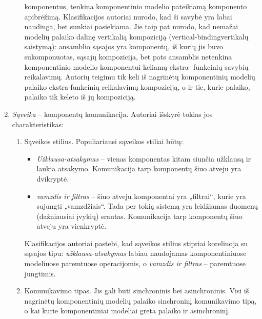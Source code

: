 \begin{enumerate}
\begin{enumerate}
        komponentus, tenkina komponentinio modelio pateikiamą
        komponento apibrėžimą. Klasifikacijos autoriai nurodo, kad
        ši savybė yra labai naudinga, bet sunkiai pasiekiama. Jie taip
        pat nurodo, kad nemažai modelių palaiko dalinę vertikalią
        kompoziciją (\gls{vertical-binding}{vertikalų saistymą}):
        ansamblio sąsajos yra komponentų, iš kurių jis buvo
        sukomponuotas, sąsajų kompozicija, bet pats ansamblis
        netenkina komponentinio modelio komponentui keliamų ekstra-
        funkcinių savybių reikalavimų. Autorių teigimu tik keli iš
        nagrinėtų komponentinių modelių palaiko ekstra-funkcinių
        reikalavimų kompoziciją, o ir tie, kurie palaiko, palaiko tik
        keleto iš jų kompoziciją.
    \end{enumerate}
  \item \emph{Sąveika}  – komponentų komunikacija.
    Autoriai išskyrė tokias jos charakteristikas:
    \begin{enumerate}
      \item Sąveikos stilius. Populiariausi sąveikos stiliai būtų:
        \begin{itemize}
          \item \emph{Užklausa-atsakymas}  –
            vienas komponentas kitam siunčia užklausą ir laukia atsakymo.
            Komunikacija tarp komponentų šiuo atveju yra dvikryptė.
          \item \emph{vamzdis ir filtras}  –
            šiuo atveju komponentai yra „filtrai“, kurie yra sujungti
            „vamzdžiais“. Tada per tokią sistemą yra leidžiamas
            duomenų (dažniausiai įvykių) srautas. Komunikacija
            tarp komponentų šiuo atveju yra vienkryptė.
        \end{itemize}
        Klasifikacijos autoriai pastebi, kad sąveikos stilius stipriai
        koreliuoja su sąsajos tipu: \emph{užklausa-atsakymas}
        labiau naudojamas komponentiniuose modeliuose paremtuose
        operacijomis, o \emph{vamzdis ir filtras} – paremtuose
        jungtimis.
      \item Komunikavimo tipas. Jis gali būti sinchroninis bei
        asinchroninis. Visi iš nagrinėtų komponentinių modelių
        palaiko sinchroninį komunikavimo tipą, o kai kurie
        komponentiniai modeliai greta palaiko ir asinchroninį.
    \end{enumerate}
\end{enumerate}


